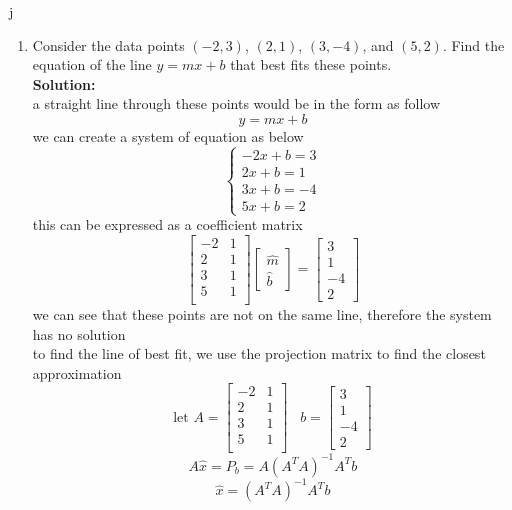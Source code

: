 j\documentclass[12pt]{article}
\begin{document}
\begin{enumerate}
	\item  Consider the data points $(-2, 3)$, $(2, 1)$, $(3, -4)$, and $(5, 2)$.  Find the equation of the line $y=mx + b$ that best fits these points. \\
    \textbf{Solution:}\\
    a straight line through these points would be in the form as follow
    \[
    y=mx+b
    \]
    we can create a system of equation as below
    \[
        \begin{cases}
            -2x+b=3\\
            2x+b=1\\
            3x+b=-4\\
            5x+b=2
        \end{cases}
    \]
this can be expressed as a coefficient matrix
    \[
    \begin{bmatrix}
        -2&1\\
        2&1\\
        3&1\\
        5&1\\
    \end{bmatrix}
    \begin{bmatrix}
        \hat{m}\\
        \hat{b}
    \end{bmatrix}
    =
    \begin{bmatrix}
        3\\1\\-4\\2
    \end{bmatrix}
    \]
    we can see that these points are not on the same line, therefore the system has no solution\\
    to find the line of best fit, we use the projection matrix to find the closest approximation
    \[
    \text{let } A = 
    \begin{bmatrix}
        -2&1\\
        2&1\\
        3&1\\
        5&1\\
    \end{bmatrix}
    \;\;\; b = 
    \begin{bmatrix}
        3\\1\\-4\\2
    \end{bmatrix}
    \]
    \[
    A\hat{x}=P_b=A(A^TA)^{-1}A^Tb
    \]
    \[
    \hat{x} = (A^TA)^{-1}A^Tb
    \]

\end{enumerate}
\end{document}
